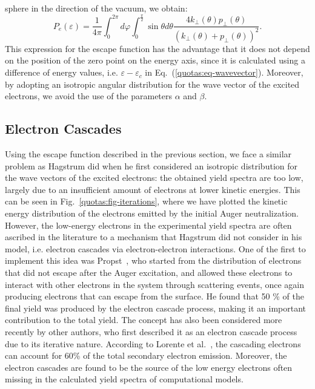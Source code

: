 \begin{refsection}
sphere in the direction of the vacuum, we obtain: 
\begin{equation} 
P_e(\varepsilon) = \frac{1}{4\pi} \int_{0}^{2\pi} d\varphi 
\int_0^{\frac{\pi}{2}} \sin{\theta} d\theta\frac{4k_\perp (\theta) p_\perp 
(\theta)}{(k_\perp (\theta) + p_\perp(\theta))^2}. 
\end{equation} 
This expression for the escape function has the advantage that it does not 
depend on the position of the zero point on the energy axis, since it is 
calculated using a difference of energy values, i.e. $\varepsilon - 
\varepsilon_c$ in Eq.~(\ref{quotas:eq-wavevector}). Moreover, by adopting an 
isotropic angular distribution for the wave vector of the excited electrons, 
we avoid the use of the parameters $\alpha$ and $\beta$. 
 
\subsection{Electron Cascades} \label{quotas:sec-cascades} 
 
Using the escape function described in the previous section, we face a similar 
problem as Hagstrum did when he first considered an isotropic distribution for 
the wave vectors of the excited electrons: the obtained yield spectra are too 
low, largely due to an insufficient amount of electrons at lower kinetic 
energies. This can be seen in Fig.~\ref{quotas:fig-iterations}, where we have 
plotted the kinetic energy distribution of the electrons emitted by the 
initial Auger neutralization. However, the low-energy electrons in the 
experimental yield spectra are often ascribed in the literature to a mechanism 
that Hagstrum did not consider in his model, i.e. electron cascades via 
electron-electron interactions. One of the first to implement this idea was  
Propst~\cite{Propst1963}, who started from the distribution of electrons that 
did not escape after the Auger excitation, and allowed these electrons to 
interact with other electrons in the system through scattering events, once 
again producing electrons that can escape from the surface. He found that 50 
\% of the final yield was produced by the electron cascade process, making it 
an important contribution to the total yield. The concept has also been 
considered more recently by other authors, who first described it as an 
electron cascade process due to its iterative nature. According to Lorente et 
al.~\cite{Lorente1995}, the cascading electrons can account for 60\% of the 
total secondary electron emission. Moreover, the electron cascades are found 
to be the source of the low energy electrons often missing in the calculated 
yield spectra of computational models.\\ 
 

\end{refsection}
